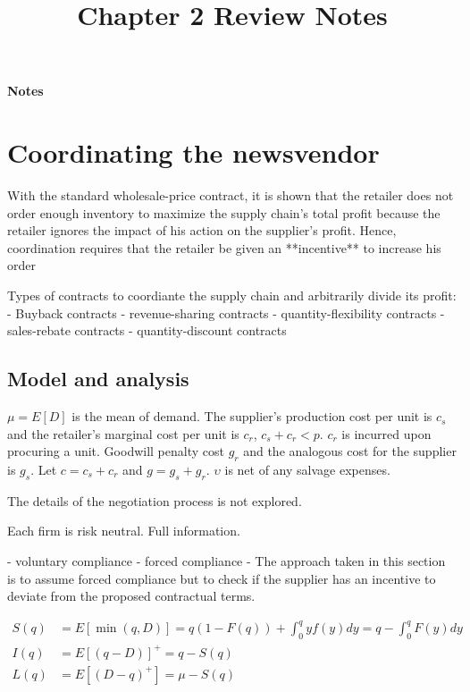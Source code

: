 \setcounter{section}{1}

\title{Chapter 2 Review Notes}

\thispagestyle{empty}

\begin{center}
{\LARGE \bf Notes}\\
\end{center}

\section{Coordinating the newsvendor}

With the standard wholesale-price contract, it is shown that the retailer does not order enough inventory to maximize the supply chain’s total profit because the retailer ignores the impact of his action on the supplier’s profit. Hence, coordination requires that the retailer be given an **incentive** to increase his order

Types of contracts to coordiante the supply chain and arbitrarily divide its profit:
- Buyback contracts
- revenue-sharing contracts
- quantity-flexibility contracts 
- sales-rebate contracts
- quantity-discount contracts


\subsection{Model and analysis}
$\mu=E[D]$ is the mean of demand. The supplier's production cost per unit is $c_s$ and the retailer's marginal cost per unit is $c_r$, $c_s+c_r<p$. $c_r$ is incurred upon procuring a unit. Goodwill penalty cost $g_r$ and the analogous cost for the supplier is $g_s$. Let $c=c_s+c_r$ and $g=g_s+g_r$. $\upsilon$ is net of any salvage expenses. 

The details of the negotiation process is not explored.

Each firm is risk neutral. Full information.

- voluntary compliance
- forced compliance
- The approach taken in this section is to assume forced compliance but to check if the supplier has an incentive to deviate from the proposed contractual terms.


\begin{align*}
    S(q)&=E[\min(q,D)]=q(1-F(q))+\int_0^q y f(y)dy=q-\int_0^q F(y)dy\\
    I(q)&=E[(q-D)]^+=q-S(q)\\
    L(q)&=E[(D-q)^+]=\mu-S(q)
\end{align*}

